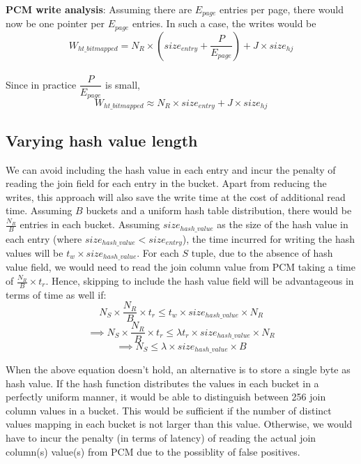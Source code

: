 \textbf{PCM write analysis}: Assuming there are $E_{page}$ entries per page, there would now be one pointer per $E_{page}$ entries. In such a case, the writes would be 
$$W_{ht\_bitmapped} = N_R \times (size_{entry} + \frac{P}{E_{page}}) + J \times size_{hj}$$\\
Since in practice $\dfrac{P}{E_{page}}$ is small, 
\begin{equation}\label{eq:ht_bmp}
 W_{ht\_bitmapped} \approx N_R \times size_{entry} + J \times size_{hj} 
\end{equation} 


\subsection{Varying hash value length}
We can avoid including the hash value in each entry and incur the penalty of reading the join field for each entry in the bucket. Apart from reducing the writes, this approach will also save the write time at the cost of additional read time. Assuming $B$ buckets and a uniform hash table distribution, there would be $\frac{N_R}{B}$ entries in each bucket. Assuming $size_{hash\_value}$ as the size of the hash value in each entry (where $size_{hash\_value} < size_{entry}$), the time incurred for writing the hash values will be $t_w \times size_{hash\_value}$. For each $S$ tuple, due to the absence of hash value field, we would need to read the join column value from PCM taking a time of $\frac{N_R}{B} \times t_r$. Hence, skipping to include the hash value field will be advantageous in terms of time as well if:
$$N_S \times \dfrac{N_R}{B} \times  t_r \leq  t_w \times size_{hash\_value} \times N_R $$
$$\implies N_S \times \dfrac{N_R}{B} \times  t_r \leq \lambda t_r \times size_{hash\_value} \times N_R $$
\begin{equation}
\implies  N_S \leq \lambda \times size_{hash\_value} \times B
\end{equation}

When the above equation doesn't hold, an alternative is to store a single byte as hash value. If the hash function distributes the values in each bucket in a perfectly uniform manner, it would be able to distinguish between 256 join column values in a bucket. This would be sufficient if the number of distinct values mapping in each bucket is not larger than this value. Otherwise, we would have to incur the penalty (in terms of latency) of reading the actual join column(s) value(s) from PCM due to the possiblity of false positives.

